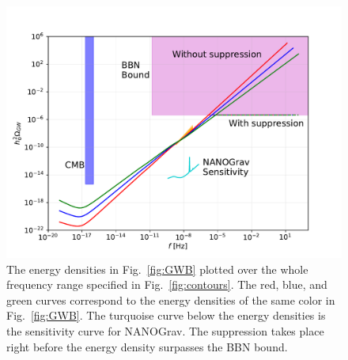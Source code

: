 \begin{figure}[ht!]
    \includegraphics[width=\linewidth]{fig/fig7.pdf}
    \caption{The energy densities in Fig.\ \ref{fig:GWB} plotted over the whole frequency range specified in Fig.\ \ref{fig:contours}. The red, blue, and green curves correspond to the energy densities of the same color in Fig.\ \ref{fig:GWB}. The turquoise curve below the energy densities is the sensitivity curve for NANOGrav. The suppression takes place right before the energy density surpasses the BBN bound.}
    \label{fig:supp}
\end{figure}